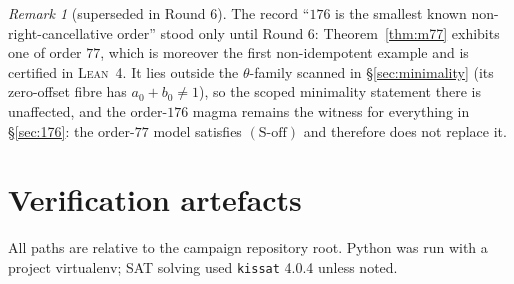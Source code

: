 \documentclass[11pt]{article}
\theoremstyle{plain}
\theoremstyle{definition}
\theoremstyle{remark}
\newtheorem*{remark*}{Remark}
\numberwithin{equation}{section}
\begin{document}
\begin{remark*}[superseded in Round 6]
The record ``$176$ is the smallest known non-right-cancellative order'' stood only until
Round 6: Theorem~\ref{thm:m77} exhibits one of order $77$, which is moreover the first
non-idempotent example and is certified in \textsc{Lean}~4. It lies outside the
$\theta$-family scanned in \S\ref{sec:minimality} (its zero-offset fibre has
$a_0+b_0\ne1$), so the scoped minimality statement there is unaffected, and the order-$176$
magma remains the witness for everything in \S\ref{sec:176}: the order-$77$ model
satisfies $(\mathrm{S\text{-}off})$ and therefore does not replace it.
\end{remark*}

\section{Verification artefacts}\label{sec:artefacts}

All paths are relative to the campaign repository root. Python was run with a project
virtualenv; SAT solving used \texttt{kissat} 4.0.4 \cite{kissat} unless noted.
\end{document}
